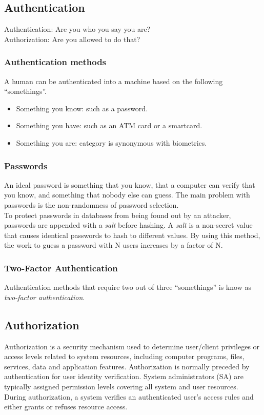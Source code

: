 \documentclass[a4paper]{article}
\begin{document}
\subsection{Authentication}
Authentication: Are you who you say you are?\\
Authorization: Are you allowed to do that?
\subsubsection{Authentication methods}
A human can be authenticated into a machine based on the following ``somethings''.
\begin{itemize}
    \item Something you know: such as a password.
    \item Something you have: such as an ATM card or a smartcard.
    \item Something you are: category is synonymous with biometrics.
\end{itemize}{}

\subsubsection{Passwords}
An ideal password is something that you know, that a computer can verify that you know, and something that nobody else can guess. The main problem with passwords is the non-randomness of password selection.\\
To protect passwords in databases from being found out by an attacker, passwords are appended with a \textit{salt} before hashing. A \textit{salt} is a non-secret value that causes identical passwords to hash to different values. By using this method, the work to guess a password with N users increases by a factor of N.

\subsubsection{Two-Factor Authentication}
Authentication methods that require two out of three ``somethings'' is know as \textit{two-factor authentication}.

\subsection{Authorization}
Authorization is a security mechanism used to determine user/client privileges or access levels related to system resources, including computer programs, files, services, data and application features. Authorization is normally preceded by authentication for user identity verification. System administrators (SA) are typically assigned permission levels covering all system and user resources.\\
During authorization, a system verifies an authenticated user's access rules and either grants or refuses resource access.
\end{document}
